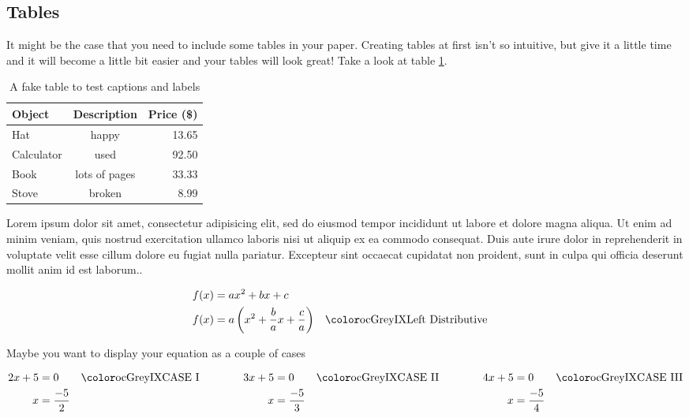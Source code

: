\documentclass[a4paper,12pt]{article}
\begin{document}
\subsection*{Tables}\label{subsec:tables}
It might be the case that you need to include some tables in your paper.  Creating tables at first isn't so intuitive, but give it a little time and it will become a little bit easier and your tables will look great! Take a look at table \ref{table:1}.

\begin{table}[h]
  \centering
\begin{tabular}{l c r} \toprule
Object & Description & Price (\$)\\ \midrule
Hat & happy & 13.65 \\
Calculator & used & 92.50 \\
Book & lots of pages & 33.33 \\
Stove & broken & 8.99 \\ \bottomrule
\end{tabular}
    \caption{A fake table to test captions and labels}
    \label{table:1}
\end{table}

Lorem ipsum dolor sit amet, consectetur adipisicing elit, sed do eiusmod tempor incididunt ut labore et dolore magna aliqua. Ut enim ad minim veniam, quis nostrud exercitation ullamco laboris nisi ut aliquip ex ea commodo consequat. Duis aute irure dolor in reprehenderit in voluptate velit esse cillum dolore eu fugiat nulla pariatur. Excepteur sint occaecat cupidatat non proident, sunt in culpa qui officia deserunt mollit anim id est laborum.\cite{mathworld:algebraicexpression}\cite{mathworld:completethesquare}.

\begin{align}
  f(x) &= ax^2+bx+c \label{eqn:quadratic} \\
  f(x) &= a\left(x^2 + \frac{b}{a}x + \frac{c}{a} \right) \lj{Left Distributive}
\end{align}

Maybe you want to display your equation as a couple of cases

\begin{equation*}
\begin{aligned}
2x + 5 &= 0 \lj{CASE I} \\
x &= \dfrac{- 5}{2} 
\end{aligned}
\qquad \qquad
\begin{aligned}
3x + 5 &= 0 \lj{CASE II} \\
x &= \dfrac{- 5}{3} 
\end{aligned}
\qquad \qquad
\begin{aligned}
4x + 5 &= 0 \lj{CASE III} \\
x &= \dfrac{- 5}{4} 
\end{aligned}
\end{equation*}
\end{document}
